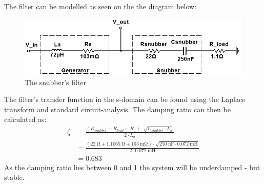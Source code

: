 The filter can be modelled as seen on the the diagram below:
\begin{figure}[H]
	\centering
	\includegraphics[width=0.9\linewidth]{Hardware/LoadSystem/SnubberFilter}
	\caption{The snubber's filter}
	\label{fig:SnubberFilter}
\end{figure}

The filter's transfer function in the s-domain can be found using the Laplace transform and standard circuit-analysis. The damping ratio can then be calculated as:
\begin{equation}
	\begin{split}
		\zeta &= \frac{(R_{snubber} + R_{load} + R_a) \cdot \sqrt{C_{snubber} \cdot  L_a}}{2 \cdot L_a}\\
		&= \frac{(\SI{22}{\ohm} + \SI{1.1065}{\ohm} + \SI{103}{\milli \ohm}) \cdot \sqrt{\SI{250}{\nano \farad} \cdot \SI{0.072}{\milli \henry}}}{2 \cdot \SI{0.072}{\milli \henry}}\\
		&= 0.683
	\end{split}
\end{equation}
As the damping ratio lies between 0 and 1 the system will be underdamped - but stable.